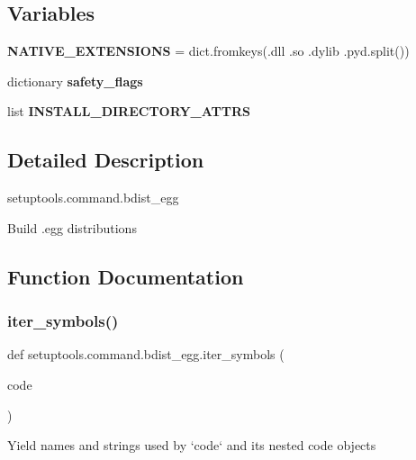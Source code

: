 \subsection*{Variables}
\begin{DoxyCompactItemize}
\item 
\mbox{\label{namespacesetuptools_1_1command_1_1bdist__egg_a0cf06b567bd34638c4533f36c5c90c25}} 
{\bfseries N\+A\+T\+I\+V\+E\+\_\+\+E\+X\+T\+E\+N\+S\+I\+O\+NS} = dict.\+fromkeys(\textquotesingle{}.dll .so .dylib .pyd\textquotesingle{}.split())
\item 
dictionary {\bfseries safety\+\_\+flags}
\item 
list {\bfseries I\+N\+S\+T\+A\+L\+L\+\_\+\+D\+I\+R\+E\+C\+T\+O\+R\+Y\+\_\+\+A\+T\+T\+RS}
\end{DoxyCompactItemize}


\subsection{Detailed Description}
\begin{DoxyVerb}setuptools.command.bdist_egg

Build .egg distributions\end{DoxyVerb}
 

\subsection{Function Documentation}
\mbox{\label{namespacesetuptools_1_1command_1_1bdist__egg_a9495041e4a8f92950d2bdb36aa77c687}} 
\subsubsection{\texorpdfstring{iter\+\_\+symbols()}{iter\_symbols()}}
{\footnotesize\ttfamily def setuptools.\+command.\+bdist\+\_\+egg.\+iter\+\_\+symbols (\begin{DoxyParamCaption}\item[{}]{code }\end{DoxyParamCaption})}

\begin{DoxyVerb}Yield names and strings used by `code` and its nested code objects\end{DoxyVerb}
 \mbox{\label{namespacesetuptools_1_1command_1_1bdist__egg_a4095fa33cd60e2569800461be97be563}} 
